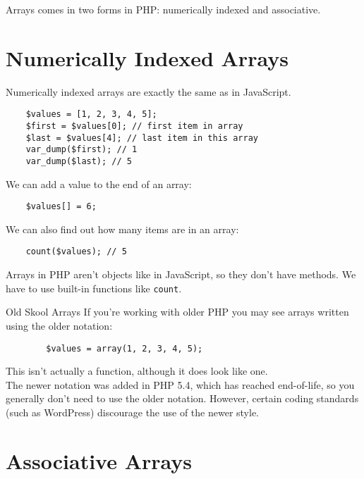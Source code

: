 Arrays comes in two forms in PHP: numerically indexed and associative.
\\


\section{Numerically Indexed Arrays}

Numerically indexed arrays are exactly the same as in JavaScript.

\begin{verbatim}
    $values = [1, 2, 3, 4, 5];
    $first = $values[0]; // first item in array
    $last = $values[4]; // last item in this array
    var_dump($first); // 1
    var_dump($last); // 5
\end{verbatim}

We can add a value to the end of an array:

\begin{verbatim}
    $values[] = 6;
\end{verbatim}

We can also find out how many items are in an array:

\begin{verbatim}
    count($values); // 5
\end{verbatim}

Arrays in PHP aren't objects like in JavaScript, so they don't have methods. We have to use built-in functions like \texttt{count}.


\begin{infobox}{Old Skool Arrays}
    If you're working with older PHP you may see arrays written using the older notation:

    \begin{verbatim}
        $values = array(1, 2, 3, 4, 5);
    \end{verbatim}

    This isn't actually a function, although it does look like one.
    \\

    The newer notation was added in PHP 5.4, which has reached end-of-life, so you generally don't need to use the older notation. However, certain coding standards (such as WordPress) discourage the use of the newer style.
\end{infobox}

\section{Associative Arrays}

